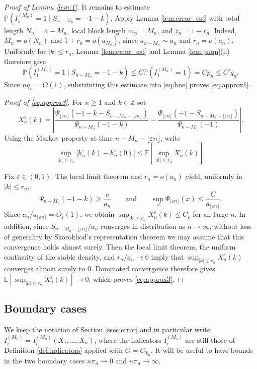 \documentclass[a4paper,11pt]{article}
\newcommand{\E}{\mathbb{E}}
\DeclareRobustCommand{\P}{\mathbb{P}}
\DeclareRobustCommand{\1}{\mathbf{1}}
\newcommand{\Z}{\mathbb{Z}}
\begin{document}
\begin{proof}[Proof of Lemma \ref{lem:1}]
It remains to estimate
$\P(I_1^{(M_n)}=1\mid S_{n-M_n}=-1-k)$. Apply Lemma
\ref{lem:error_est} with total length $N_n=n-M_n$, local block length
$m_n=M_n$, and $z_n=1+r_n$. Indeed, $M_n=o(N_n)$ and
$1+r_n=o(a_{N_n})$, since $a_{n-M_n}\sim a_n$ and $r_n=o(a_n)$.
Uniformly for $|k|\le r_n$, Lemma \ref{lem:error_est} and Lemma
\ref{lem:pnqn}\textup{(ii)} therefore give
$$
\P(I_1^{(M_n)}=1\mid S_{n-M_n}=-1-k)
\le C\P(I_1^{(M_n)}=1)=Cp_n\le C'q_n.
$$
Since $nq_n=O(1)$, substituting this estimate into \eqref{eq:hne} proves
\eqref{eq:approx1}.

\emph{Proof of \eqref{eq:approx3}.} For $n \geq 1$ and $k \in \Z$ set
$$X^{\varepsilon}_{n}(k)=\left|\frac{\Psi_{\lfloor \varepsilon n \rfloor}(-1-k-S_{n-M_{n}-\lfloor \varepsilon n \rfloor})}{\Psi_{n-M_{n}}(-1-k)} - \frac{\Psi_{\lfloor \varepsilon n \rfloor}(-1-S_{n-M_{n}-\lfloor \varepsilon n \rfloor})}{\Psi_{n-M_{n}}(-1)}\right|.
$$
Using the Markov property at time $n-M_{n}-\lfloor \varepsilon n \rfloor$, write
$$  \sup_{|k|\leq r_n}|h_n^{\varepsilon}(k)-h_n^{\varepsilon}(0)|
\leq 
\E\!\left[ \sup_{|k|\leq r_n} X^{\varepsilon}_{n}(k) \right].
$$


Fix $\varepsilon\in(0,1)$. The local limit theorem and
$r_n=o(a_n)$ yield, uniformly in $|k|\le r_n$,
$$
  \Psi_{n-M_n}(-1-k)\ge \frac{c}{a_n}
  \qquad\text{and}\qquad
  \sup_x\Psi_{\lfloor\varepsilon n\rfloor}(x)
  \le \frac{C}{a_{\lfloor\varepsilon n\rfloor}}.
$$
Since $a_n/a_{\lfloor\varepsilon n\rfloor}=O_\varepsilon(1)$, we obtain
$\sup_{|k|\le r_n}X_n^\varepsilon(k)\le C_\varepsilon$ for all large $n$. In addition, since $S_{n-M_{n}-\lfloor \varepsilon n \rfloor}/a_{n}$ converges in distribution as $ n \rightarrow\infty$, without loss of generality by Skorokhod's representation theorem we may assume that this convergence holds almost surely. Then the  local limit theorem, the uniform continuity of the
stable density, and $r_n/a_n\to0$ imply  that $
  \sup_{|k|\le r_n}X_n^\varepsilon(k)$ converges almost surely to $0$.
Dominated convergence therefore gives
$
  \E[\sup_{|k|\le r_n}X_n^\varepsilon(k)]
\to 0$,
which proves \eqref{eq:approx3}.
\end{proof}

\subsection{Boundary cases}

We keep the notation of Section \ref{ssec:error} and in particular write $I^{(M_{n})}_{i}=I^{(M_{n})}_{i}(X_{1}, \ldots,X_{n})$,   where the indicators $I_i^{(M_{n})}$ are still those of Definition
\ref{def:indicators} applied with $G=G_{k_n}$. It will be useful to have bounds in the two boundary cases
$n \pi_{n} \rightarrow 0$ and $n \pi_{n} \rightarrow \infty$.
\end{document}
